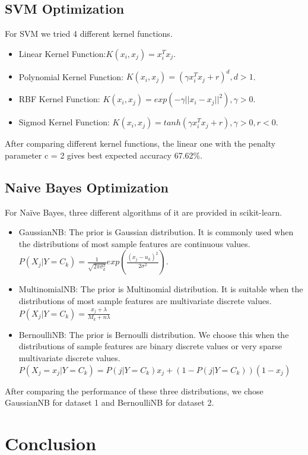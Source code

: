 \documentclass[letterpaper]{article} %
\begin{document}
\subsection{SVM Optimization}

For SVM we tried 4 different kernel functions.
\begin{itemize}
\item Linear Kernel Function:$K(x_i,x_j)=x_i^Tx_j$.
\item Polynomial Kernel Function: $K(x_i,x_j)=(\gamma x_i^T x_j+r)^d,d>1$.
\item RBF Kernel Function: $K(x_i,x_j)=exp(-\gamma||x_i-x_j||^2),\gamma>0$.
\item Sigmod Kernel Function: $K(x_i,x_j)=tanh(\gamma x_i^T x_j+r), \gamma>0,r<0$.
\end{itemize}

After comparing different kernel functions, the linear one with the penalty parameter c = 2 gives best expected accuracy 67.62\%.

\subsection{Naive Bayes Optimization}

For Naïve Bayes, three different algorithms of it are provided in scikit-learn.
\begin{itemize}
\item GaussianNB: The prior is Gaussian distribution. It is commonly used when the distributions of most sample features are continuous values.$P(X_j|Y=C_k) = \frac{1}{\sqrt{2 \pi \sigma_k^2}}exp(\frac{(x_j-u_k)^2}{2\sigma^2})$.
\item MultinomialNB: The prior is Multinomial distribution. It is suitable when the distributions of most sample features are multivariate discrete values.$P(X_j|Y=C_k)=\frac{x_j+\lambda}{M_k+n\lambda}$
\item BernoulliNB: The prior is Bernoulli distribution. We choose this when the distributions of sample features are binary discrete values or very sparse multivariate discrete values.$P(X_j=x_j|Y=C_k)=P(j|Y=C_k)x_j+(1-P(j|Y=C_k))(1-x_j)$
\end{itemize}

After comparing the performance of these three distributions, we chose GaussianNB for dataset 1 and BernoulliNB for dataset 2.

\section{Conclusion}
\end{document}
